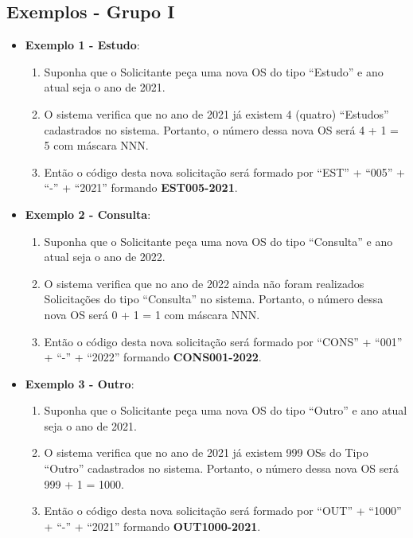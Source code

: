 \subsection{Exemplos - Grupo I}

\begin{itemize}
	\item \textbf{Exemplo 1 - Estudo}:
	
	\begin{enumerate}
		\item Suponha que o Solicitante peça uma nova OS do tipo ``Estudo'' e ano atual seja o ano de 2021.
		
		\item O sistema verifica que no ano de 2021 já existem 4 (quatro) ``Estudos'' cadastrados no sistema. Portanto, o número dessa nova OS será 4 + 1 = 5 com máscara NNN.
		
		\item Então o código desta nova solicitação será formado por ``EST'' + ``005'' + ``-'' + ``2021'' formando \textbf{EST005-2021}.			
	\end{enumerate}

	\item \textbf{Exemplo 2 - Consulta}:

\begin{enumerate}
	\item Suponha que o Solicitante peça uma nova OS do tipo ``Consulta'' e ano atual seja o ano de 2022.
	
	\item O sistema verifica que no ano de 2022 ainda não foram realizados Solicitações do tipo ``Consulta'' no sistema. Portanto, o número dessa nova OS será 0 + 1 = 1 com máscara NNN. 
	
	\item Então o código desta nova solicitação será formado por ``CONS'' + ``001'' + ``-'' + ``2022'' formando \textbf{CONS001-2022}.			
\end{enumerate}

	\item \textbf{Exemplo 3 - Outro}:

\begin{enumerate}
	\item Suponha que o Solicitante peça uma nova OS do tipo ``Outro'' e ano atual seja o ano de 2021.
	
	\item O sistema verifica que no ano de 2021 já existem 999 OSs do Tipo ``Outro'' cadastrados no sistema. Portanto, o número dessa nova OS será 999 + 1 = 1000.
	
	\item Então o código desta nova solicitação será formado por ``OUT'' + ``1000'' + ``-'' + ``2021'' formando \textbf{OUT1000-2021}.			
\end{enumerate}

\end{itemize}

